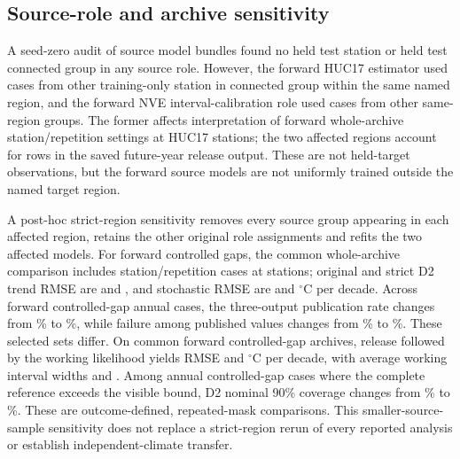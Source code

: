 \documentclass[draft,linenumbers]{agujournal2025}
\begin{document}



























\subsection{Source-role and archive sensitivity}
A seed-zero audit of \RHModels{} source model bundles found no held test station or held test connected group in any source role. However, the forward HUC17 estimator used \RHHucCases{} cases from \RHHucStations{} other training-only station in \RHHucGroups{} connected group within the same named region, and the forward NVE interval-calibration role used \RHNveCases{} cases from \RHNveGroups{} other same-region groups. The former affects interpretation of \RHArchiveCases{} forward whole-archive station/repetition settings at \RHArchiveStations{} HUC17 stations; the two affected regions account for \RHFutureCases{} rows in the saved future-year release output. These are not held-target observations, but the forward source models are not uniformly trained outside the named target region.

A post-hoc strict-region sensitivity removes every source group appearing in each affected region, retains the other original role assignments and refits the two affected models. For forward controlled gaps, the common whole-archive comparison includes \SRPairN{} station/repetition cases at \SRPairStations{} stations; original and strict D2 trend RMSE are \SROldDTwo{} and \SRNewDTwo{}, and stochastic RMSE are \SROldStoch{} and \SRNewStoch{} $^{\circ}$C per decade. Across \SRFutureN{} forward controlled-gap annual cases, the three-output publication rate changes from \SROldRet\% to \SRNewRet\%, while failure among published values changes from \SROldRisk\% to \SRNewRisk\%. These selected sets differ. On \SRIntN{} common forward controlled-gap archives, release followed by the working likelihood yields RMSE \SRIntOld{} and \SRIntNew{}$^{\circ}$C per decade, with average working interval widths \SRIntOldWidth{} and \SRIntNewWidth{}. Among \SRAnnualN{} annual controlled-gap cases where the complete reference exceeds the visible bound, D2 nominal 90\% coverage changes from \SRAnnualOld\% to \SRAnnualNew\%. These are outcome-defined, repeated-mask comparisons. This smaller-source-sample sensitivity does not replace a strict-region rerun of every reported analysis or establish independent-climate transfer.
\end{document}
